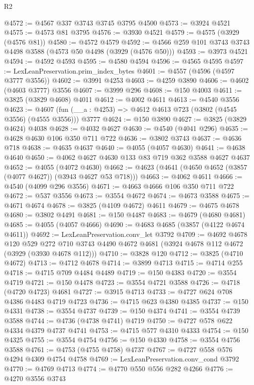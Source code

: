 \begin{lexlean}{R2}
\begin{coremodule}
@4572 := @4567 @337 @3743 @3745 @3795 @4500
@4573 := @3924 @4521
@4575 := @4573 @81 @3795
@4576 := @3930 @4521
@4579 := @4575 (@3929 (@4576 @81))
@4580 := @4572 @4579
@4592 := @4566 @259 @101 @3743 @3743 @4498 @3588 (@4573 @50 @4498 (@3929 (@4576 @50)))
@4593 := @3973 @4521
@4594 := @4592 @4593
@4595 := @4580 @4594
@4596 := @4565 @4595
@4597 := LexLeanPreservation.prim_index_bytes
@4601 := @4557 (@4596 (@4597 @3777 @3556))
@4602 := @3991 @4253
@4603 := @4259 @3890
@4606 := @4602 (@4603 @3777) @3556
@4607 := @3999 @296
@4608 := @150 @4003
@4611 := @3825 (@3829 @4608) @4011
@4612 := @4002 @4611
@4613 := @4540 @3556
@4623 := @4607 (fun (__a : @4253) => @4612 @4613 @723 (@3802 (@4545 @3556) (@4555 @3556))) @3777
@4624 := @150 @3890
@4627 := @3825 (@3829 @4624) @4038
@4628 := @4032 @4627
@4630 := @4540 (@4041 @296)
@4635 := @4628 @4630 @106 @350 @711 @722
@4636 := @3802 @3743
@4637 := @4636 @718
@4638 := @4635 @4637
@4640 := @4055 (@4057 @4630)
@4641 := @4638 @4640
@4650 := @4062 @4627 @4630 @133 @83 @719 @362 @3588 @4627 @4637
@4652 := @4055 (@4072 @4630)
@4662 := @4623 (@4641 (@4650 @4652 (@3857 (@4077 @4627)) (@3943 @4627 @53 @718)))
@4663 := @4062 @4611
@4666 := @4540 (@4099 @296 @3556)
@4671 := @4663 @4666 @106 @350 @711 @722
@4672 := @537 @3556
@4673 := @3554 @4672
@4674 := @4673 @3588
@4675 := @4671 @4674
@4678 := @3825 (@4109 @4672) @4611
@4679 := @4675 @4678
@4680 := @3802 @4491
@4681 := @150 @4487
@4683 := @4679 (@4680 @4681)
@4685 := @4055 (@4057 @4666)
@4690 := @4683 @4685 (@3857 (@4122 @4674 @4611))
@4692 := LexLeanPreservation.conv_let @3792
@4709 := @4692
    @4678
    @120
    @529
    @272
    @710
    @3743
    @4490
    @4672
    @4681
    (@3924 @4678 @112 @4672 (@3929 (@3930 @4678 @112)))
@4710 := @3828 @120
@4712 := @3825 (@4710 @4672)
@4713 := @4712 @4678
@4714 := @3899 @4713
@4715 := @4714 @255
@4718 := @4715 @709 @4484 @4489
@4719 := @150 @4383
@4720 := @3554 @4719
@4721 := @150 @4478
@4723 := @3554 @4721 @3588
@4726 := @4718 (@4720 @4723) @4681
@4727 := @3915 @4713
@4733 := @4727 @624 @708 @4386 @4483 @4719 @4723
@4736 := @4715 @623 @4380 @4385
@4737 := @150 @4331
@4738 := @3554 @4737
@4739 := @150 @4374
@4741 := @3554 @4739 @3588
@4744 := @4736 (@4738 @4741) @4719
@4750 := @4727 @578 @622 @4334 @4379 @4737 @4741
@4753 := @4715 @577 @4310 @4333
@4754 := @150 @4325
@4755 := @3554 @4754
@4756 := @150 @4330
@4758 := @3554 @4756 @3588
@4761 := @4753 (@4755 @4758) @4737
@4767 := @4727 @558 @576 @4294 @4309 @4754 @4758
@4769 := LexLeanPreservation.conv_cond @3792
@4770 := @4769 @4713
@4774 := @4770 @550 @556 @282 @4266
@4776 := @4270 @3556 @3743

\end{coremodule}
\end{lexlean}

